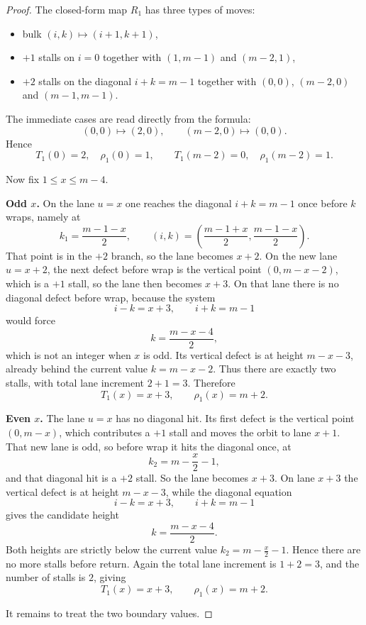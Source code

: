 \begin{proof}
The closed-form map $R_1$ has three types of moves:
\begin{itemize}[leftmargin=2em]
\item bulk $(i,k)\mapsto(i+1,k+1)$,
\item $+1$ stalls on $i=0$ together with $(1,m-1)$ and $(m-2,1)$,
\item $+2$ stalls on the diagonal $i+k=m-1$ together with $(0,0)$, $(m-2,0)$ and $(m-1,m-1)$.
\end{itemize}

The immediate cases are read directly from the formula:
\[
(0,0)\mapsto(2,0),\qquad (m-2,0)\mapsto(0,0).
\]
Hence
\[
T_1(0)=2,\quad \rho_1(0)=1,\qquad T_1(m-2)=0,\quad \rho_1(m-2)=1.
\]

Now fix $1\le x\le m-4$.

\smallskip
\noindent\textbf{Odd $x$.}
On the lane $u=x$ one reaches the diagonal $i+k=m-1$ once before $k$ wraps, namely at
\[
k_1=\frac{m-1-x}{2},\qquad
(i,k)=\left(\frac{m-1+x}{2},\frac{m-1-x}{2}\right).
\]
That point is in the $+2$ branch, so the lane becomes $x+2$.
On the new lane $u=x+2$, the next defect before wrap is the vertical point $(0,m-x-2)$, which is a $+1$
stall, so the lane then becomes $x+3$.
On that lane there is no diagonal defect before wrap, because the system
\[
i-k=x+3,\qquad i+k=m-1
\]
would force
\[
k=\frac{m-x-4}{2},
\]
which is not an integer when $x$ is odd.
Its vertical defect is at height $m-x-3$, already behind the current value $k=m-x-2$.
Thus there are exactly two stalls, with total lane increment $2+1=3$.
Therefore
\[
T_1(x)=x+3,\qquad \rho_1(x)=m+2.
\]

\smallskip
\noindent\textbf{Even $x$.}
The lane $u=x$ has no diagonal hit.
Its first defect is the vertical point $(0,m-x)$, which contributes a $+1$ stall and moves the orbit to
lane $x+1$.
That new lane is odd, so before wrap it hits the diagonal once, at
\[
k_2=m-\frac{x}{2}-1,
\]
and that diagonal hit is a $+2$ stall.
So the lane becomes $x+3$.
On lane $x+3$ the vertical defect is at height $m-x-3$, while the diagonal equation
\[
i-k=x+3,\qquad i+k=m-1
\]
gives the candidate height
\[
k=\frac{m-x-4}{2}.
\]
Both heights are strictly below the current value $k_2=m-\frac{x}{2}-1$.
Hence there are no more stalls before return.
Again the total lane increment is $1+2=3$, and the number of stalls is $2$, giving
\[
T_1(x)=x+3,\qquad \rho_1(x)=m+2.
\]

It remains to treat the two boundary values.


\end{proof}
